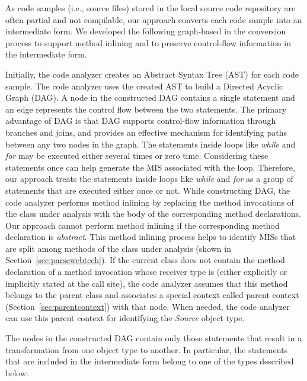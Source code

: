 As code samples (i.e., source files) stored in the local source code
repository are often partial and not compilable, our approach converts
each code sample into an intermediate form. We developed the
following graph-based 
 in the conversion process to support
method inlining and to preserve control-flow information in the
intermediate form.

Initially, the code analyzer creates an Abstract Syntax Tree (AST)
for each code sample. The code analyzer uses the created AST to
build a Directed Acyclic Graph (DAG). A node in the constructed DAG
contains a single statement and an edge represents the control flow
between the two statements. The primary advantage of DAG is that DAG
supports control-flow information through branches and joins, and
provides an effective mechanism for identifying paths between any
two nodes in the graph. The statements inside loops like
\emph{while} and \emph{for} may be executed either several times or
zero time. Considering these statements once can help generate the
MIS associated with the loop. Therefore, our approach treats the
statements inside loops like \emph{while} and \emph{for} as a group
of statements that are executed either once or not. While
constructing DAG, the code analyzer performs method inlining by
replacing the method invocations of the class under analysis with
the body of the corresponding method declarations. Our approach
cannot perform method inlining if the corresponding method
declaration is \emph{abstract}. This method inlining process helps
to identify MISs that are split among methods of the class under
analysis (shown in Section~\ref{sec:parsewebtech}). If the current
class does not contain the method declaration of a method invocation
whose receiver type is  (either explicitly or
implicitly stated at the call site), the code analyzer assumes that
this method belongs to the parent class and associates a special
context called parent context (Section~\ref{sec:parentcontext}) with
that node. When needed, the code analyzer can use this parent
context for identifying the \emph{Source} object type.

The nodes in the constructed DAG contain only those statements that
result in a transformation from one object type to another. In
particular, the statements that are included in the intermediate
form belong to one of the types described below:

